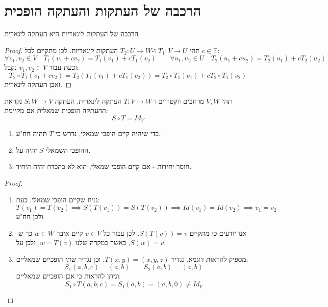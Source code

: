 \documentclass{tstextbook}
\begin{document}
\section{הרכבה של העתקות והעתקה הופכית}

\begin{proposition}
הרכבה של העתקות לינאריות היא העתקה לינארית

\end{proposition}
\begin{proof}
תהי \(T_{1}:V\to U\) ו-\(T_{2}:U\to W\) העתקות לינאריות. לכן מתקיים לכל \(c \in \mathbb{F}\):
$$\forall v_{1},v_{2} \in V\quad T_{1}(v_{1}+cv_{2})=T_{1}(v_{1})+cT_{1}(v_{2})\qquad \forall u_{1},u_{2} \in U\quad  T_{2}(u_{1}+cu_{2})=T_{2}(u_{1})+cT_{2}(u_{2})$$
וכעת עבור \(v_{1},v_{2} \in V\) נקבל:
$$T_{2}\circ T_{1}(v_{1}+cv_{2})=T_{2}(T_{1}(v_{1})+cT_{1}(v_{2}))=T_{2}\circ T_{1}(v_{1})+cT_{2}\circ T_{1}(v_{2})$$
ואכן העתקה לינארית.

\end{proof}
\begin{definition}
תהי \(V, W\)  מרחבים ווקטורים ו-\(T:V\to W\) העתקה לינארית. העתקה \(S:W\to V\) נקראת ההעתקה הופכית שמאלית אם מקיימת:
$$S\circ  T=Id_{V}$$

\end{definition}
\begin{proposition}
  \begin{enumerate}
    \item כדי שיהיה קיים הופכי שמאלי, נדרש כי \(T\) תהיה חח"ע. 


    \item ההופכי השמאלי \(S\) יהיה על. 


    \item חוסר יחידות - אם קיים הופכי שמאלי, הוא לא בהכרח יהיה היחיד. 


  \end{enumerate}
\end{proposition}
\begin{proof}
  \begin{enumerate}
    \item נניח שקיים הופכי שמאלי. כעת: 
$$T(v_{1})=T(v_{2})\implies S(T(v_{1}))=S(T(v_{2}))\implies Id(v_{1})=Id(v_{2})\implies v_{1}=v_{2}$$
ולכן חח"ע.


    \item אנו יודעים כי מתקיים \(S(T(v))=v\). לכן עבור כל \(v \in V\) קיים איבר \(w \in W\) כך ש-\(S(w)=v\), כאשר במקרה שלנו \(w=T(v)\), ולכן על. 


    \item מספיק להראות דוגמא. נגדיר \(T(x,y)=(x,y,z)\). וכן נגדיר שתי הופכיים שמאליים: 
$$S_{1}(a,b,c)=(a,b)\qquad S_{2}(a,b)=(a,b)$$
וניתן להראות כי אכן הופכיים שמאליים:
$$S_{1}\circ  T(a,b,c)=S_{1}(a,b)=(a,b,0)\neq Id_{V}$$


  \end{enumerate}
\end{proof}
\end{document}
